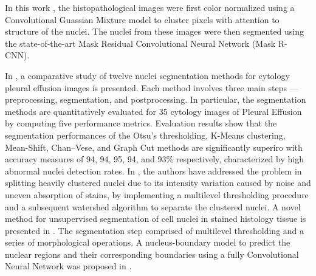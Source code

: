 \documentclass{comjnl}
\begin{document}
In this work \cite{hwejin}, the histopathological images were first color normalized using a Convolutional Guassian Mixture model to cluster pixels with attention to structure of the nuclei. The nuclei from these images were then segmented using the state-of-the-art Mask Residual Convolutional Neural Network (Mask R-CNN).

In \cite{win2018comparative}, a comparative study of twelve nuclei segmentation methods for cytology pleural effusion images is presented. Each method involves three main steps --- preprocessing, segmentation, and postprocessing. In particular, the segmentation methods are quantitatively evaluated for 35 cytology images of Pleural Effusion by computing five performance metrics. Evaluation results show that the segmentation performances of the Otsu's thresholding, K-Means clustering, Mean-Shift, Chan–Vese, and Graph Cut methods are significantly superiro with accuracy measures of 94, 94, 95, 94, and 93\% respectively, characterized by high abnormal nuclei detection rates. In \cite{abdolhoseini}, the authors have addressed the problem in splitting heavily clustered nuclei due to its intensity variation caused by noise and uneven absorption of stains, by implementing a multilevel thresholding procedure and a subsequent watershed algorithm to separate the clustered nuclei. A novel method for unsupervised segmentation of cell nuclei in stained histology tissue is presented in \cite{phoulady}. The segmentation step comprised of multilevel thresholding and a series of morphological operations. A nucleus-boundary model to predict the nuclear regions and their corresponding boundaries using a fully Convolutional Neural Network was proposed in \cite{cui2019deep}.
\end{document}
